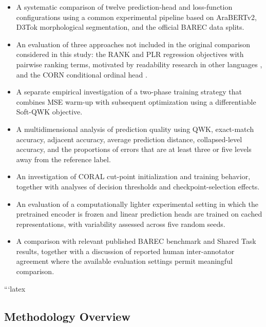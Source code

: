 \documentclass[12pt]{report}
\begin{document}
\begin{itemize}

    \item A systematic comparison of twelve prediction-head and loss-function configurations using a common experimental pipeline based on AraBERTv2, D3Tok morphological segmentation, and the official BAREC data splits.

    \item An evaluation of three approaches not included in the original comparison considered in this study: the RANK and PLR regression objectives with pairwise ranking terms, motivated by readability research in other languages \cite{trokhymovych2024open,lee2022neural}, and the CORN conditional ordinal head \cite{shi2023deep}.

    \item A separate empirical investigation of a two-phase training strategy that combines MSE warm-up with subsequent optimization using a differentiable Soft-QWK objective.

    \item A multidimensional analysis of prediction quality using QWK, exact-match accuracy, adjacent accuracy, average prediction distance, collapsed-level accuracy, and the proportions of errors that are at least three or five levels away from the reference label.

    \item An investigation of CORAL cut-point initialization and training behavior, together with analyses of decision thresholds and checkpoint-selection effects.

    \item An evaluation of a computationally lighter experimental setting in which the pretrained encoder is frozen and linear prediction heads are trained on cached representations, with variability assessed across five random seeds.

    \item A comparison with relevant published BAREC benchmark and Shared Task results, together with a discussion of reported human inter-annotator agreement where the available evaluation settings permit meaningful comparison.

\end{itemize}
```latex
\subsection{Methodology Overview}
\label{sec:methodology-overview}
\end{document}
